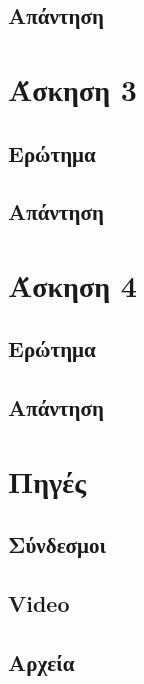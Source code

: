 \documentclass[12pt, fleqn, leqno]{extreport}
\begin{document}
\newpage
\section{Απάντηση}

\chapter{Άσκηση 3}
\section{Ερώτημα}

\newpage
\section{Απάντηση}

\chapter{Άσκηση 4}
\section{Ερώτημα}

\newpage
\section{Απάντηση}

\chapter{Πηγές}
\section{Σύνδεσμοι}
\section{Video}
\section{Αρχεία}
\end{document}
